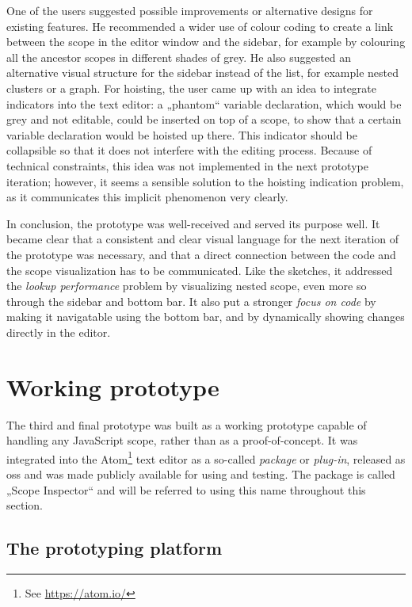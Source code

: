 One of the users suggested possible improvements or alternative designs
for existing features. He recommended a wider use of colour coding to
create a link between the scope in the editor window and the sidebar,
for example by colouring all the ancestor scopes in different shades of
grey. He also suggested an alternative visual structure for the sidebar
instead of the list, for example nested clusters or a graph. For
hoisting, the user came up with an idea to integrate indicators into the
text editor: a „phantom“ variable declaration, which would be grey and
not editable, could be inserted on top of a scope, to show that a
certain variable declaration would be hoisted up there. This indicator
should be collapsible so that it does not interfere with the editing
process. Because of technical constraints, this idea was not implemented
in the next prototype iteration; however, it seems a sensible solution
to the hoisting indication problem, as it communicates this implicit
phenomenon very clearly.

In conclusion, the prototype was well-received and served its purpose
well. It became clear that a consistent and clear visual language for
the next iteration of the prototype was necessary, and that a direct
connection between the code and the scope visualization has to be
communicated. Like the sketches, it addressed the \emph{lookup
performance} problem by visualizing nested scope, even more so through
the sidebar and bottom bar. It also put a stronger \emph{focus on code}
by making it navigatable using the bottom bar, and by dynamically
showing changes directly in the editor.

\section{Working prototype}\label{working-prototype}

The third and final prototype was built as a working prototype capable
of handling any JavaScript scope, rather than as a proof-of-concept. It
was integrated into the Atom\footnote{See \url{https://atom.io/}} text
editor as a so-called \emph{package} or \emph{plug-in}, released as
\gls{oss} and was made publicly available for using and testing. The
package is called „Scope Inspector“ and will be referred to using this
name throughout this section.

\subsection{The prototyping platform}\label{the-prototyping-platform}

